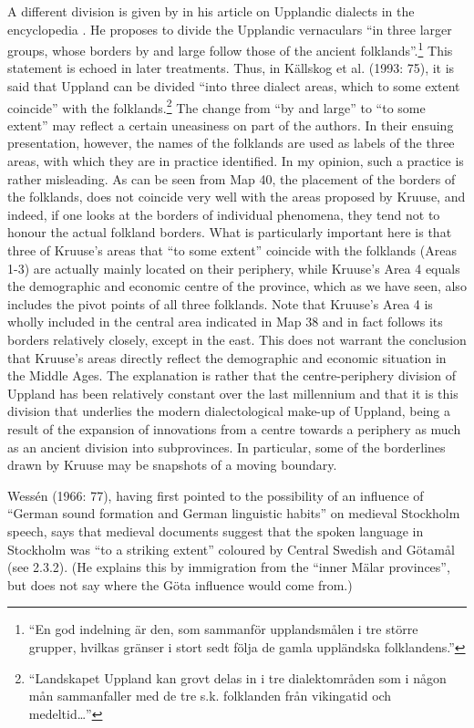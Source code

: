 A different division is given by \citet[1194]{Hesselman1920} in his article on Upplandic dialects in the encyclopedia . He proposes to divide the Upplandic vernaculars “in three larger groups, whose borders by and large follow those of the ancient folklands”.\footnote{ “En god indelning är den, som sammanför upplandsmålen i tre större grupper, hvilkas gränser i stort sedt följa de gamla uppländska folklandens.” } This statement is echoed in later treatments. Thus, in Källskog et al. (1993: 75), it is said that Uppland can be divided “into three dialect areas, which to some extent coincide” with the folklands.\footnote{ “Landskapet Uppland kan grovt delas in i tre dialektområden som i någon mån sammanfaller med de tre s.k. folklanden från vikingatid och medeltid…” } The change from “by and large” to “to some extent” may reflect a certain uneasiness on part of the authors. In their ensuing presentation, however, the names of the folklands are used as labels of the three areas, with which they are in practice identified. In my opinion, such a practice is rather misleading. As can be seen from Map 40, the placement of the borders of the folklands, does not coincide very well with the areas proposed by Kruuse, and indeed, if one looks at the borders of individual phenomena, they tend not to honour the actual folkland borders. What is particularly important here is that three of Kruuse’s areas that “to some extent” coincide with the folklands (Areas 1-3) are actually mainly located on their periphery, while Kruuse’s Area 4 equals the demographic and economic centre of the province, which as we have seen, also includes the pivot points of all three folklands. Note that Kruuse’s Area 4 is wholly included in the central area indicated in Map 38 and in fact follows its borders relatively closely, except in the east. This does not warrant the conclusion that Kruuse’s areas directly reflect the demographic and economic situation in the Middle Ages. The explanation is rather that the centre-periphery division of Uppland has been relatively constant over the last millennium and that it is this division that underlies the modern dialectological make-up of Uppland, being a result of the expansion of innovations from a centre towards a periphery as much as an ancient division into subprovinces. In particular, some of the borderlines drawn by Kruuse may be snapshots of a moving boundary.




Wessén (1966: 77), having first pointed to the possibility of an influence of “German sound formation and German linguistic habits” on medieval Stockholm speech, says that medieval documents suggest that the spoken language in Stockholm was “to a striking extent” coloured by Central Swedish and Götamål (see 2.3.2). (He explains this by immigration from the “inner Mälar provinces”, but does not say where the Göta influence would come from.)




